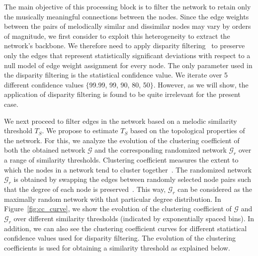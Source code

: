 The main objective of this processing block is to filter the network to retain only the musically meaningful connections between the nodes. Since the edge weights between the pairs of melodically similar and dissimilar nodes may vary by orders of magnitude, we first consider to exploit this heterogeneity to extract the network's backbone. We therefore need to apply disparity filtering~\cite{Serrano09PNAS} to preserve only the edges that represent statistically significant deviations with respect to a null model of edge weight assignment for every node. The only parameter used in the disparity filtering is the statistical confidence value. We iterate over 5 different confidence values $\lbrace$99.99, 99, 90, 80, 50$\rbrace$. However, as we will show, the application of disparity filtering is found to be quite irrelevant for the present case.



We next proceed to filter edges in the network based on a melodic similarity threshold $T_S$. We propose to estimate $T_S$ based on the topological properties of the network. For this, we analyze the evolution of the clustering coefficient of both the obtained network $\mathcal{G}$ and the corresponding randomized network $\mathcal{G}_r$ over a range of similarity thresholds. Clustering coefficient measures the extent to which the nodes in a network tend to cluster together~\cite{newman2003structure}. The randomized network $\mathcal{G}_r$ is obtained by swapping the edges between randomly selected node pairs such that the degree of each node is preserved~\cite{maslov2002specificity}. This way, $\mathcal{G}_r$ can be considered as the maximally random network with that particular degree distribution. In Figure~\ref{fig:cc_curve}, we show the evolution of the clustering coefficient of $\mathcal{G}$ and $\mathcal{G}_r$ over different similarity thresholds (indicated by exponentially spaced bins). In addition, we can also see the clustering coefficient curves for different statistical confidence values used for disparity filtering. The evolution of the clustering coefficients is used for obtaining a similarity threshold as explained below.

